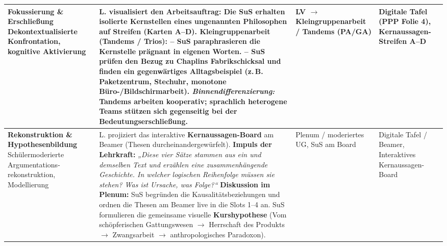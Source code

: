 \documentclass[a4paper, fontsize=9pt, landscape]{scrartcl}
\begin{document}
\begin{tabularx}{\textwidth}{|p{3.2cm}|X|p{3.0cm}|p{3.4cm}|}
\textbf{Fokussierung \&} \newline \textbf{Erschließung} \newline
\tiny\color{primaryBlue} Dekontextualisierte \newline Konfrontation, \newline kognitive Aktivierung & 
L. visualisiert den Arbeitsauftrag: Die SuS erhalten isolierte Kernstellen eines ungenannten Philosophen auf Streifen (Karten A--D). \newline
\textbf{Kleingruppenarbeit (Tandems / Trios):} \newline
-- SuS paraphrasieren die Kernstelle prägnant in eigenen Worten. \newline
-- SuS prüfen den Bezug zu Chaplins Fabrikschicksal und finden ein gegenwärtiges Alltagsbeispiel (z.\,B. Paketzentrum, Stechuhr, monotone Büro-/Bildschirmarbeit). \newline
\textit{Binnendifferenzierung:} Tandems arbeiten kooperativ; sprachlich heterogene Teams stützen sich gegenseitig bei der Bedeutungserschließung. & 
LV $\rightarrow$ \newline
Kleingruppenarbeit / \newline
Tandems (PA/GA) & 
Digitale Tafel \newline
(PPP Folie 4), \newline
Kernaussagen- \newline
Streifen A--D \\
\hline

\textbf{Rekonstruktion \&} \newline \textbf{Hypothesenbildung} \newline
\tiny\color{primaryBlue} Schülermoderierte \newline Argumentations- \newline rekonstruktion, Modellierung & 
L. projiziert das interaktive \textbf{Kernaussagen-Board} am Beamer (Thesen durcheinandergewürfelt). \newline
\textbf{Impuls der Lehrkraft:} \textit{„Diese vier Sätze stammen aus ein und demselben Text und erzählen eine zusammenhängende Geschichte. In welcher logischen Reihenfolge müssen sie stehen? Was ist Ursache, was Folge?“} \newline
\textbf{Diskussion im Plenum:} SuS begründen die Kausalitätsbeziehungen und ordnen die Thesen am Beamer live in die Slots 1--4 an. \newline
SuS formulieren die gemeinsame visuelle \textbf{Kurshypothese} (Vom schöpferischen Gattungswesen $\rightarrow$ Herrschaft des Produkts $\rightarrow$ Zwangsarbeit $\rightarrow$ anthropologisches Paradoxon). & 
Plenum / \newline
moderiertes UG, \newline
SuS am Board & 
Digitale Tafel / \newline
Beamer, \newline
Interaktives \newline
Kernaussagen-Board \\
\hline


\end{tabularx}
\end{document}
